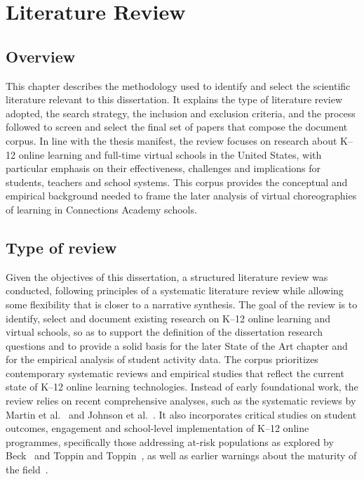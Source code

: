 \chapter{Literature Review}
\label{chap:litreview}


\section{Overview}
This chapter describes the methodology used to identify and select the scientific literature relevant to this dissertation.
It explains the type of literature review adopted, the search strategy, the inclusion and exclusion criteria, and the process followed to screen and select the final set of papers that compose the document corpus.
In line with the thesis manifest, the review focuses on research about K--12 online learning and full-time virtual schools in the United States, with particular emphasis on their effectiveness, challenges and implications for students, teachers and school systems.
This corpus provides the conceptual and empirical background needed to frame the later analysis of virtual choreographies of learning in Connections Academy schools.

\section{Type of review}
Given the objectives of this dissertation, a structured literature review was conducted, following principles of a systematic literature review while allowing some flexibility that is closer to a narrative synthesis.
The goal of the review is to identify, select and document existing research on K--12 online learning and virtual schools, so as to support the definition of the dissertation research questions and to provide a solid basis for the later State of the Art chapter and for the empirical analysis of student activity data.
The corpus prioritizes contemporary systematic reviews and empirical studies that reflect the current state of K--12 online learning technologies.
Instead of early foundational work, the review relies on recent comprehensive analyses, such as the systematic reviews by Martin et al.~\cite{martin_systematic_2020} and Johnson et al.~\cite{online_johnson_2022}.
It also incorporates critical studies on student outcomes, engagement and school-level implementation of K--12 online programmes, specifically those addressing at-risk populations as explored by Beck~\cite{beck_atrisk_2024,beck_prepared_2023} and Toppin and Toppin~\cite{virtual_toppin_2016}, as well as earlier warnings about the maturity of the field~\cite{Barbour2016Virtual}.


